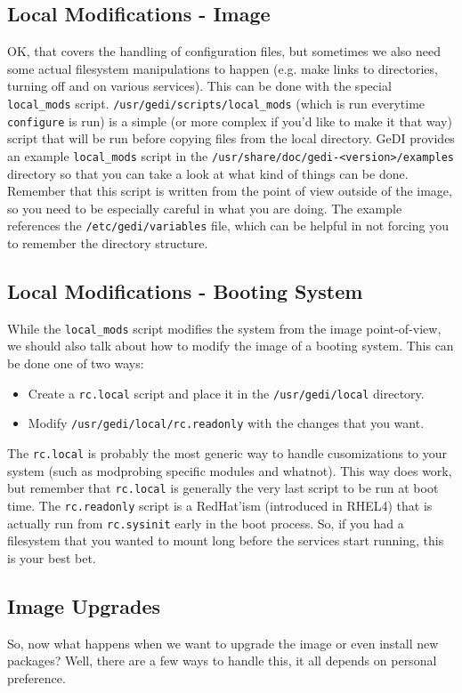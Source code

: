 \documentclass[10pt,a4paper,titlepage]{article}
\begin{document}
\subsection{Local Modifications - Image}
OK, that covers the handling of configuration files, but sometimes we also need
some actual filesystem manipulations to happen (e.g. make links to directories,
turning off and on various services).  This can be done with the special
\verb!local_mods! script.  \verb!/usr/gedi/scripts/local_mods! (which is run
everytime \verb!configure! is run) is a simple (or more complex if you'd like
to make it that way) script that will be run before copying files from the
local directory.  GeDI provides an example \verb!local_mods! script in the
\verb!/usr/share/doc/gedi-<version>/examples! directory so that you can take a
look at what kind of things can be done.  Remember that this script is written
from the point of view outside of the image, so you need to be especially
careful in what you are doing.  The example references the
\verb!/etc/gedi/variables! file, which can be helpful in not forcing you
to remember the directory structure.

\subsection{Local Modifications - Booting System}
While the \verb!local_mods! script modifies the system from the image
point-of-view, we should also talk about how to modify the image of a booting
system.  This can be done one of two ways:

\begin{itemize}
\item Create a \verb!rc.local! script and place it in the \verb!/usr/gedi/local!
directory.
\item Modify \verb!/usr/gedi/local/rc.readonly! with the changes that you want.
\end{itemize}

The \verb!rc.local! is probably the most generic way to handle cusomizations to
your system (such as modprobing specific modules and whatnot).  This way does
work, but remember that \verb!rc.local! is generally the very last script to be
run at boot time.  The \verb!rc.readonly! script is a RedHat'ism (introduced in
RHEL4) that is actually run from \verb!rc.sysinit! early in the boot process.
So, if you had a filesystem that you wanted to mount long before the services
start running, this is your best bet.

\subsection{Image Upgrades}
So, now what happens when we want to upgrade the image or even install new
packages?  Well, there are a few ways to handle this, it all depends on personal
preference.
\end{document}
